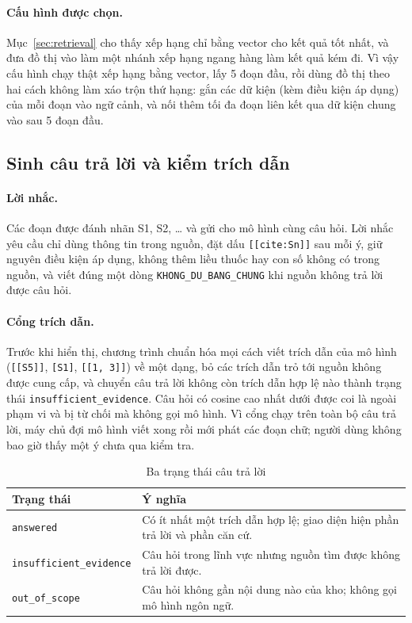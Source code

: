 \documentclass[11pt,a4paper]{article}
\begin{document}
\paragraph{Cấu hình được chọn.}
Mục~\ref{sec:retrieval} cho thấy xếp hạng chỉ bằng vector cho kết quả tốt nhất, và đưa đồ thị vào làm một nhánh xếp
hạng ngang hàng làm kết quả kém đi. Vì vậy cấu hình chạy thật xếp hạng bằng vector, lấy 5 đoạn đầu, rồi dùng đồ thị
theo hai cách không làm xáo trộn thứ hạng: gắn các dữ kiện (kèm điều kiện áp dụng) của mỗi đoạn vào ngữ cảnh, và nối
thêm tối đa \expandN{} đoạn liên kết qua dữ kiện chung vào sau 5 đoạn đầu.

\subsection{Sinh câu trả lời và kiểm trích dẫn}

\paragraph{Lời nhắc.}
Các đoạn được đánh nhãn S1, S2, \dots{} và gửi cho mô hình cùng câu hỏi. Lời nhắc yêu cầu chỉ dùng thông tin trong
nguồn, đặt dấu \texttt{[[cite:Sn]]} sau mỗi ý, giữ nguyên điều kiện áp dụng, không thêm liều thuốc hay con số không
có trong nguồn, và viết đúng một dòng \texttt{KHONG\_DU\_BANG\_CHUNG} khi nguồn không trả lời được câu hỏi.

\paragraph{Cổng trích dẫn.}
Trước khi hiển thị, chương trình chuẩn hóa mọi cách viết trích dẫn của mô hình (\texttt{[[S5]]}, \texttt{[S1]},
\texttt{[[1, 3]]}) về một dạng, bỏ các trích dẫn trỏ tới nguồn không được cung cấp, và chuyển câu trả lời không còn
trích dẫn hợp lệ nào thành trạng thái \texttt{insufficient\_evidence}. Câu hỏi có cosine cao nhất dưới \oosMin{}
được coi là ngoài phạm vi và bị từ chối mà không gọi mô hình. Vì cổng chạy trên toàn bộ câu trả lời, máy chủ đợi mô
hình viết xong rồi mới phát các đoạn chữ; người dùng không bao giờ thấy một ý chưa qua kiểm tra.

\begin{table}[H]
\centering
\caption{Ba trạng thái câu trả lời}
\begin{tabularx}{\linewidth}{L{4.3cm}Y}
\toprule
Trạng thái & Ý nghĩa \\
\midrule
\texttt{answered} & Có ít nhất một trích dẫn hợp lệ; giao diện hiện phần trả lời và phần căn cứ. \\
\texttt{insufficient\_evidence} & Câu hỏi trong lĩnh vực nhưng nguồn tìm được không trả lời được. \\
\texttt{out\_of\_scope} & Câu hỏi không gần nội dung nào của kho; không gọi mô hình ngôn ngữ. \\
\bottomrule
\end{tabularx}
\end{table}
\end{document}
